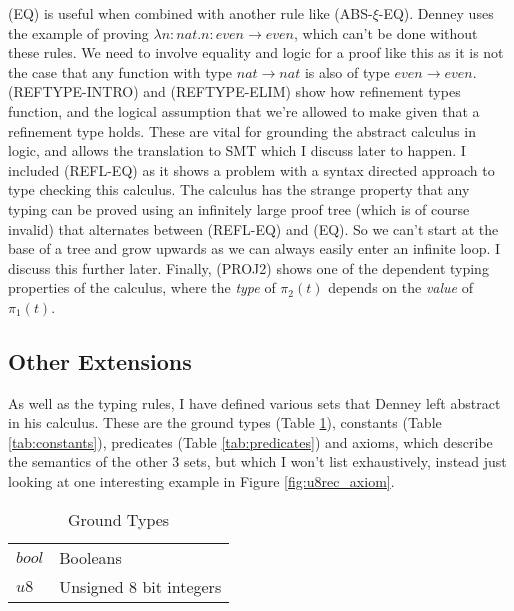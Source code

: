 (EQ) is useful when combined with another rule like (ABS-$\xi$-EQ).
Denney uses the example of proving $\lambda n: nat.n : even \rightarrow even$, which can't be done
without these rules.
We need to involve equality and logic for a proof like this as it is not the case that any function
with type $nat \rightarrow nat$ is also of type $even \rightarrow even$.
(REFTYPE-INTRO) and (REFTYPE-ELIM) show how refinement types function, and the logical assumption
that we're allowed to make given that a refinement type holds.
These are vital for grounding the abstract calculus in logic, and allows the translation to SMT
which I discuss later to happen.
I included (REFL-EQ) as it shows a problem with a syntax directed approach to type checking this
calculus.
The calculus has the strange property that any typing can be proved using an infinitely large
proof tree (which is of course invalid) that alternates between (REFL-EQ) and (EQ).
So we can't start at the base of a tree and grow upwards as we can always easily enter an infinite
loop.
I discuss this further later.
Finally, (PROJ2) shows one of the dependent typing properties of the calculus, where the \textit{type}
of $\pi_2(t)$ depends on the \textit{value} of $\pi_1(t)$.

\subsection{Other Extensions}

As well as the typing rules, I have defined various sets that Denney left abstract in his calculus.
These are the ground types (Table \ref{tab:ground_types}), constants (Table \ref{tab:constants}),
predicates (Table \ref{tab:predicates}) and axioms, which describe the semantics of the other 3
sets, but which I won't list exhaustively, instead just looking at one interesting example in
Figure \ref{fig:u8rec_axiom}.

\begin{table}
    \centering
    \begin{tabular}{|l|l|}
        \cline{1-2}
        $bool$ & Booleans\\\cline{1-2}
        $u8$ & Unsigned 8 bit integers\\\cline{1-2}
    \end{tabular}
    \caption{Ground Types}
    \label{tab:ground_types}
\end{table}

